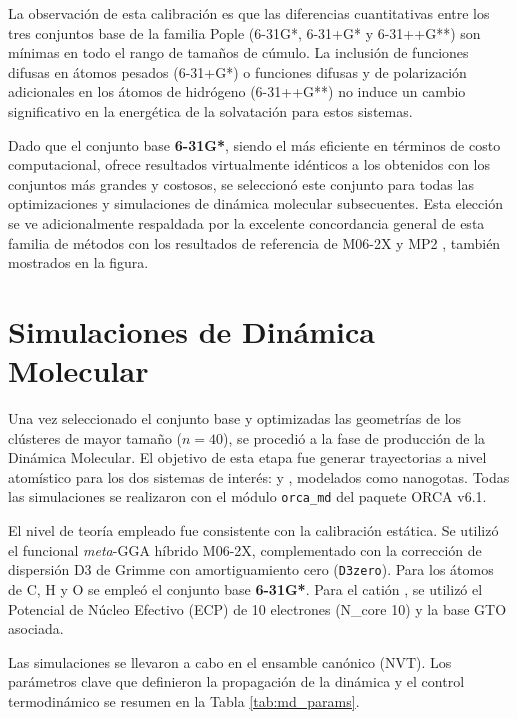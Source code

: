 La observación de esta calibración es que las diferencias cuantitativas entre los tres conjuntos base de la familia Pople (6-31G*, 6-31+G* y 6-31++G**) son mínimas en todo el rango de tamaños de cúmulo. La inclusión de funciones difusas en átomos pesados (6-31+G*) o funciones difusas y de polarización adicionales en los átomos de hidrógeno (6-31++G**) no induce un cambio significativo en la energética de la solvatación para estos sistemas.

Dado que el conjunto base \textbf{6-31G*}, siendo el más eficiente en términos de costo computacional, ofrece resultados virtualmente idénticos a los obtenidos con los conjuntos más grandes y costosos, se seleccionó este conjunto para todas las optimizaciones y simulaciones de dinámica molecular subsecuentes. Esta elección se ve adicionalmente respaldada por la excelente concordancia general de esta familia de métodos con los resultados de referencia de M06-2X \cite{Me-2023-01} y MP2 \cite{Me-2022-01}, también mostrados en la figura.





\section{Simulaciones de Dinámica Molecular}
\label{sec:met_md}

Una vez seleccionado el conjunto base y optimizadas las geometrías de los clústeres de mayor tamaño ($n=40$), se procedió a la fase de producción de la Dinámica Molecular. El objetivo de esta etapa fue generar trayectorias a nivel atomístico para los dos sistemas de interés:  y , modelados como nanogotas. Todas las simulaciones se realizaron con el módulo \texttt{orca\_md} del paquete ORCA v6.1.

El nivel de teoría empleado fue consistente con la calibración estática. Se utilizó el funcional \textit{meta}-GGA híbrido M06-2X, complementado con la corrección de dispersión D3 de Grimme con amortiguamiento cero (\texttt{D3zero}). Para los átomos de C, H y O se empleó el conjunto base \textbf{6-31G*}. Para el catión , se utilizó el Potencial de Núcleo Efectivo (ECP) de 10 electrones (N\_core 10) y la base GTO asociada.

Las simulaciones se llevaron a cabo en el ensamble canónico (NVT). Los parámetros clave que definieron la propagación de la dinámica y el control termodinámico se resumen en la Tabla \ref{tab:md_params}.

